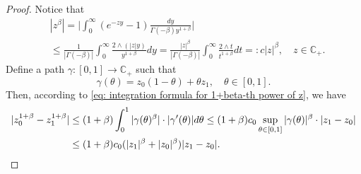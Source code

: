 \documentclass[12pt,oneside,english]{amsart}
\theoremstyle{plain}
\theoremstyle{definition}
\numberwithin{equation}{section}
\begin{document}
\begin{proof}
    Notice that
\begin{align}
\label{eq: upper bound for beta power of z}
    &|z^{\beta}|
    = \Big|\int_0^\infty (e^{-zy}-1) \frac{dy}{\Gamma(-\beta)y^{1+\beta}}\Big|
    \\&\leq \frac{1}{|\Gamma(-\beta)|}\int_0^\infty \frac{2\wedge (|z|y)}{y^{1+\beta}}dy
    = \frac{|z|^{\beta}}{|\Gamma(-\beta)|}\int_0^\infty \frac{2\wedge t}{t^{1+\beta}}dt =: c |z|^{\beta},
    \quad z\in \mathbb C_+.
\end{align}
    Define a path $\gamma: [0,1] \to \mathbb C_+$ such that
\[
    \gamma(\theta)
    = z_0 (1-\theta) + \theta z_1,
    \quad \theta \in [0,1].
\]
    Then, according to \eqref{eq: integration formula for 1+beta-th power of z}, we have
\begin{align}
    |z_0^{1+\beta} - z_1^{1+\beta}|
    &\leq (1+\beta) \int_0^1 |\gamma(\theta)^{\beta}|\cdot |\gamma'(\theta)|d\theta
    \leq (1+\beta) c_0 \sup_{\theta \in [0,1]} |\gamma(\theta)|^{\beta} \cdot |z_1-z_0|
    \\&\leq (1+\beta) c_0 ( |z_1|^{\beta}+|z_0|^{\beta} ) |z_1-z_0|.
    \qedhere
\end{align}
\end{proof}
\end{document}
